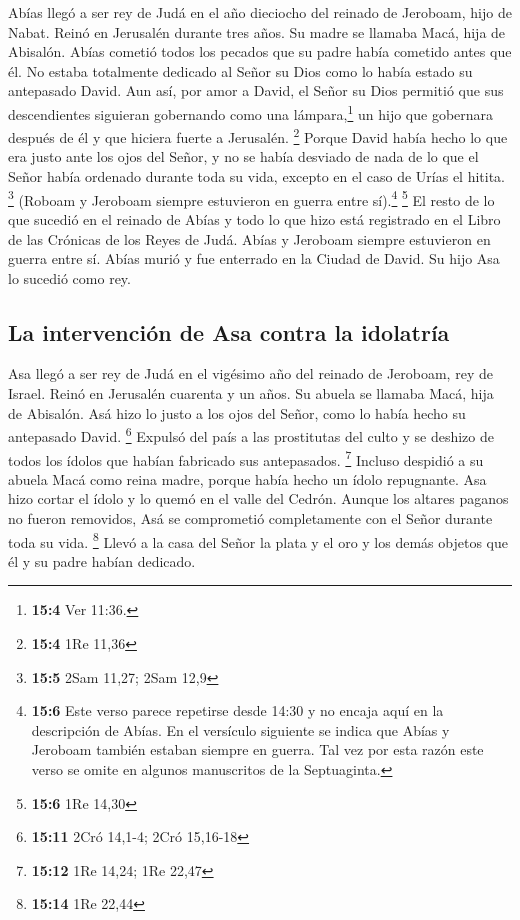  Abías llegó a ser rey de Judá en el año dieciocho del
reinado de Jeroboam, hijo de Nabat.  Reinó en Jerusalén
durante tres años. Su madre se llamaba Macá, hija de Abisalón.
 Abías cometió todos los pecados que su padre había
cometido antes que él. No estaba totalmente dedicado al Señor su Dios
como lo había estado su antepasado David.  Aun así, por
amor a David, el Señor su Dios permitió que sus descendientes siguieran
gobernando como una lámpara,\footnote{\textbf{15:4} Ver 11:36.} un hijo
que gobernara después de él y que hiciera fuerte a Jerusalén.
\footnote{\textbf{15:4} 1Re 11,36}  Porque David había
hecho lo que era justo ante los ojos del Señor, y no se había desviado
de nada de lo que el Señor había ordenado durante toda su vida, excepto
en el caso de Urías el hitita. \footnote{\textbf{15:5} 2Sam 11,27; 2Sam
  12,9}  (Roboam y Jeroboam siempre estuvieron en guerra
entre sí).\footnote{\textbf{15:6} Este verso parece repetirse desde
  14:30 y no encaja aquí en la descripción de Abías. En el versículo
  siguiente se indica que Abías y Jeroboam también estaban siempre en
  guerra. Tal vez por esta razón este verso se omite en algunos
  manuscritos de la Septuaginta.} \footnote{\textbf{15:6} 1Re 14,30}
 El resto de lo que sucedió en el reinado de Abías y todo
lo que hizo está registrado en el Libro de las Crónicas de los Reyes de
Judá. Abías y Jeroboam siempre estuvieron en guerra entre sí.
 Abías murió y fue enterrado en la Ciudad de David. Su
hijo Asa lo sucedió como rey.

\hypertarget{la-intervenciuxf3n-de-asa-contra-la-idolatruxeda}{%
\subsection{La intervención de Asa contra la
idolatría}\label{la-intervenciuxf3n-de-asa-contra-la-idolatruxeda}}

 Asa llegó a ser rey de Judá en el vigésimo año del
reinado de Jeroboam, rey de Israel.  Reinó en Jerusalén
cuarenta y un años. Su abuela se llamaba Macá, hija de Abisalón.
 Asá hizo lo justo a los ojos del Señor, como lo había
hecho su antepasado David. \footnote{\textbf{15:11} 2Cró 14,1-4; 2Cró
  15,16-18}  Expulsó del país a las prostitutas del culto
y se deshizo de todos los ídolos que habían fabricado sus antepasados.
\footnote{\textbf{15:12} 1Re 14,24; 1Re 22,47}  Incluso
despidió a su abuela Macá como reina madre, porque había hecho un ídolo
repugnante. Asa hizo cortar el ídolo y lo quemó en el valle del Cedrón.
 Aunque los altares paganos no fueron removidos, Asá se
comprometió completamente con el Señor durante toda su vida. \footnote{\textbf{15:14}
  1Re 22,44}  Llevó a la casa del Señor la plata y el oro
y los demás objetos que él y su padre habían dedicado.

